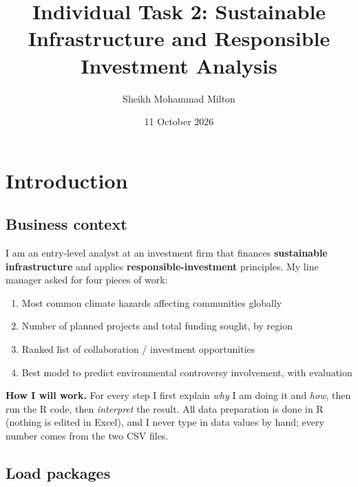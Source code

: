\documentclass[
]{article}
\title{Individual Task 2: Sustainable Infrastructure and Responsible
Investment Analysis}
\author{Sheikh Mohammad Milton}
\date{11 October 2026}
\newenvironment{Shaded}{\begin{snugshade}}{\end{snugshade}}
\newcommand{\AttributeTok}[1]{\textcolor[rgb]{0.13,0.29,0.53}{#1}}
\newcommand{\ConstantTok}[1]{\textcolor[rgb]{0.56,0.35,0.01}{#1}}
\newcommand{\FunctionTok}[1]{\textcolor[rgb]{0.13,0.29,0.53}{\textbf{#1}}}
\newcommand{\NormalTok}[1]{#1}
\newcommand{\SpecialCharTok}[1]{\textcolor[rgb]{0.81,0.36,0.00}{\textbf{#1}}}
\providecommand{\tightlist}{%
  \setlength{\itemsep}{0pt}\setlength{\parskip}{0pt}}
\begin{document}
\maketitle

{
\setcounter{tocdepth}{3}
\tableofcontents
}
\begin{Shaded}
\end{Shaded}

\section{Introduction}\label{introduction}

\subsection{Business context}\label{business-context}

I am an entry-level analyst at an investment firm that finances
\textbf{sustainable infrastructure} and applies
\textbf{responsible-investment} principles. My line manager asked for
four pieces of work:

\begin{enumerate}
\def\labelenumi{\arabic{enumi}.}
\tightlist
\item
  Most common climate hazards affecting communities globally
\item
  Number of planned projects and total funding sought, by region
\item
  Ranked list of collaboration / investment opportunities
\item
  Best model to predict environmental controversy involvement, with
  evaluation
\end{enumerate}

\textbf{How I will work.} For every step I first explain \emph{why} I am
doing it and \emph{how}, then run the R code, then \emph{interpret} the
result. All data preparation is done in R (nothing is edited in Excel),
and I never type in data values by hand; every number comes from the two
CSV files.

\subsection{Load packages}\label{load-packages}
\end{document}
